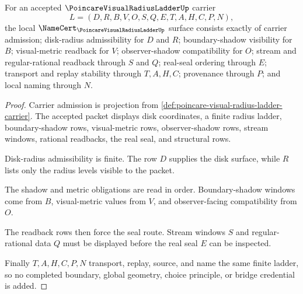 \begin{theorem}
\label{thm:poincare-visual-radius-ladder-namecert-obligations}
For an accepted $\PoincareVisualRadiusLadderUp$ carrier
$$
L=(D,R,B,V,O,S,Q,E,T,A,H,C,P,N),
$$
the local $\NameCert_{\PoincareVisualRadiusLadderUp}$ surface consists exactly of carrier admission; disk-radius admissibility for $D$ and $R$; boundary-shadow visibility for $B$; visual-metric readback for $V$; observer-shadow compatibility for $O$; stream and regular-rational readback through $S$ and $Q$; real-seal ordering through $E$; transport and replay stability through $T,A,H,C$; provenance through $P$; and local naming through $N$.
\end{theorem}
\begin{proof}
Carrier admission is projection from \autoref{def:poincare-visual-radius-ladder-carrier}. The accepted packet displays disk coordinates, a finite radius ladder, boundary-shadow rows, visual-metric rows, observer-shadow rows, stream windows, rational readbacks, the real seal, and structural rows.

Disk-radius admissibility is finite. The row $D$ supplies the disk surface, while $R$ lists only the radius levels visible to the packet.

The shadow and metric obligations are read in order. Boundary-shadow windows come from $B$, visual-metric values from $V$, and observer-facing compatibility from $O$.

The readback rows then force the seal route. Stream windows $S$ and regular-rational data $Q$ must be displayed before the real seal $E$ can be inspected.

Finally $T,A,H,C,P,N$ transport, replay, source, and name the same finite ladder, so no completed boundary, global geometry, choice principle, or bridge credential is added.
\end{proof}

